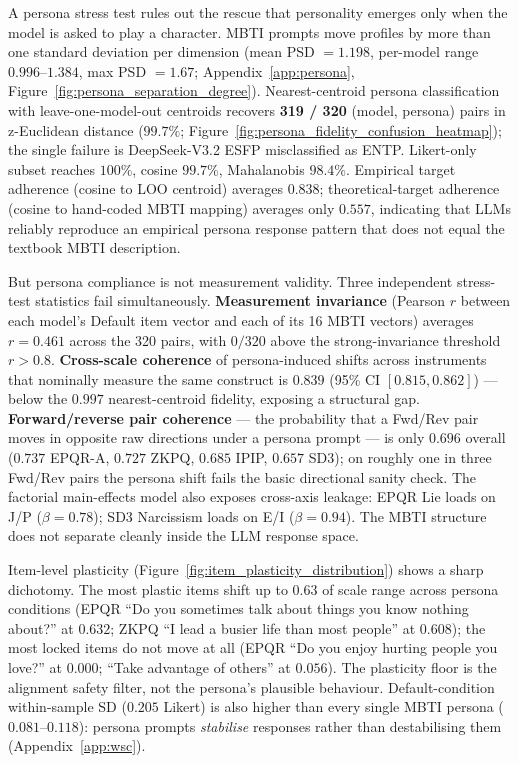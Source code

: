 \documentclass[11pt]{article}
\begin{document}
A persona stress test rules out the rescue that personality emerges only when the model is asked to play a character. MBTI prompts move profiles by more than one standard deviation per dimension (mean PSD $= 1.198$, per-model range $0.996$--$1.384$, max PSD $= 1.67$; Appendix~\ref{app:persona}, Figure~\ref{fig:persona_separation_degree}). Nearest-centroid persona classification with leave-one-model-out centroids recovers \textbf{319 / 320} (model, persona) pairs in z-Euclidean distance ($99.7\%$; Figure~\ref{fig:persona_fidelity_confusion_heatmap}); the single failure is DeepSeek-V3.2 ESFP misclassified as ENTP. Likert-only subset reaches $100\%$, cosine $99.7\%$, Mahalanobis $98.4\%$. Empirical target adherence (cosine to LOO centroid) averages $0.838$; theoretical-target adherence (cosine to hand-coded MBTI mapping) averages only $0.557$, indicating that LLMs reliably reproduce an empirical persona response pattern that does not equal the textbook MBTI description.

But persona compliance is not measurement validity. Three independent stress-test statistics fail simultaneously. \textbf{Measurement invariance} (Pearson $r$ between each model's Default item vector and each of its 16 MBTI vectors) averages $r = 0.461$ across the 320 pairs, with $0/320$ above the strong-invariance threshold $r > 0.8$. \textbf{Cross-scale coherence} of persona-induced shifts across instruments that nominally measure the same construct is $0.839$ (95\% CI $[0.815, 0.862]$) --- below the $0.997$ nearest-centroid fidelity, exposing a structural gap. \textbf{Forward/reverse pair coherence} --- the probability that a Fwd/Rev pair moves in opposite raw directions under a persona prompt --- is only $0.696$ overall ($0.737$ EPQR-A, $0.727$ ZKPQ, $0.685$ IPIP, $0.657$ SD3); on roughly one in three Fwd/Rev pairs the persona shift fails the basic directional sanity check. The factorial main-effects model also exposes cross-axis leakage: EPQR Lie loads on J/P ($\beta = 0.78$); SD3 Narcissism loads on E/I ($\beta = 0.94$). The MBTI structure does not separate cleanly inside the LLM response space.

Item-level plasticity (Figure~\ref{fig:item_plasticity_distribution}) shows a sharp dichotomy. The most plastic items shift up to $0.63$ of scale range across persona conditions (EPQR ``Do you sometimes talk about things you know nothing about?'' at $0.632$; ZKPQ ``I lead a busier life than most people'' at $0.608$); the most locked items do not move at all (EPQR ``Do you enjoy hurting people you love?'' at $0.000$; ``Take advantage of others'' at $0.056$). The plasticity floor is the alignment safety filter, not the persona's plausible behaviour. Default-condition within-sample SD ($0.205$ Likert) is also higher than every single MBTI persona ($0.081$--$0.118$): persona prompts \emph{stabilise} responses rather than destabilising them (Appendix~\ref{app:wsc}).
\end{document}
